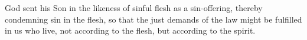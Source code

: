
\lettrine{G}{}od sent his Son in the likeness of sinful flesh as a sin-offering, thereby condemning sin in the flesh, so that the just demands of the law might be fulfilled in us who live, not according to the flesh, but according to the spirit.
